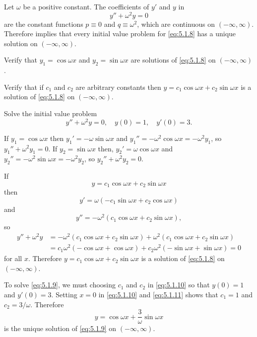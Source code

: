 \begin{example}\label{example:5.1.2}
Let $\omega$ be a positive constant. The coefficients of $y'$
and $y$  in
\begin{equation}\label{eq:5.1.8}
y''+\omega^2y=0
\end{equation}
are the constant functions $p\equiv0$ and $q\equiv\omega^2$,
which are continuous on $(-\infty,\infty)$. Therefore
implies that every initial value problem for \eqref{eq:5.1.8}  has a
unique solution on $(-\infty,\infty)$.
\begin{alist}
\item %
Verify that $y_1=\cos\omega x$ and $y_2=\sin\omega x$ are
solutions of \eqref{eq:5.1.8} on $(-\infty,\infty)$.
\item %
Verify that if $c_1$ and $c_2$ are arbitrary constants then
$y=c_1\cos\omega x+c_2\sin\omega x$ is a solution of \eqref{eq:5.1.8}
on $(-\infty,\infty)$.
\item %
Solve the initial value problem
\begin{equation}\label{eq:5.1.9}
y''+\omega^2y=0,\quad y(0)=1,\quad y'(0)=3.
\end{equation}
\end{alist}
\end{example}

\begin{alistSolution}
\item If $y_1=\cos\omega x$ then $y_1'=-\omega\sin\omega x$
and
$y_1''=-\omega^2\cos\omega x=-\omega^2y_1$, so  $y_1''+\omega^2y_1=0$.
If $y_2=\sin\omega x$ then, $y_2'=\omega\cos\omega x$ and
$y_2''=-\omega^2\sin\omega x=-\omega^2y_2$, so  $y_2''+\omega^2y_2=0$.

\item If
\begin{equation}\label{eq:5.1.10}
y=c_1\cos\omega x+c_2\sin\omega x
\end{equation}
 then
\begin{equation}\label{eq:5.1.11}
y'=\omega(-c_1\sin\omega x+c_2\cos\omega x)
\end{equation}
and
\[
y''=-\omega^2(c_1\cos\omega x+c_2\sin\omega x),
\]
so
\begin{align*}
y''+\omega^2y&= -\omega^2(c_1\cos\omega x+c_2\sin\omega x)
+\omega^2(c_1\cos\omega x+c_2\sin\omega x)\\
&=c_1\omega^2(-\cos\omega x+\cos\omega x)+
c_2\omega^2(-\sin\omega x+\sin\omega x)=0
\end{align*}
for all $x$. Therefore $y=c_1\cos\omega x+c_2\sin\omega x$ is a
solution of \eqref{eq:5.1.8} on $(-\infty,\infty)$.

\item
To solve
\eqref{eq:5.1.9}, we must choosing $c_1$ and $c_2$ in \eqref{eq:5.1.10}
so that $y(0)=1$ and $y'(0)=3$. Setting $x=0$ in \eqref{eq:5.1.10}
and \eqref{eq:5.1.11} shows that $c_1=1$ and $c_2=3/\omega$.
Therefore
\[
y=\cos\omega x+\frac{3}{\omega}\sin\omega x
\]
 is the unique solution of \eqref{eq:5.1.9} on
$(-\infty,\infty)$.
\end{alistSolution}

